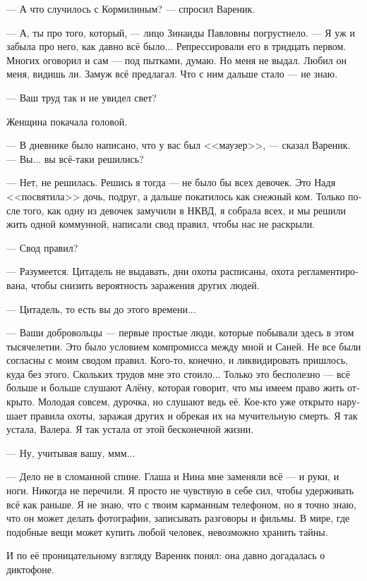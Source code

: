 \documentclass[a5paper,12pt,fleqn]{extbook}\usepackage{cooltooltips}\usepackage{polyglossia}\setdefaultlanguage[babelshorthands=true]{russian}\setotherlanguage{english}\defaultfontfeatures{Ligatures=TeX,Mapping=tex-text} \usepackage{xcolor}\definecolor{lightgray}{HTML}{bbbbbb}\color{lightgray}\newcommand{\ml}[3]{\textenglish{\textcolor{black}{#3}}}
\begin{document}
--- А что случилось с Кормилиным? --- спросил Вареник.

--- А, ты про того, который, --- лицо Зинаиды Павловны погрустнело.
--- Я уж и забыла про него, как давно всё было...
Репрессировали его в тридцать первом.
Многих оговорил и сам --- под пытками, думаю.
Но меня не выдал.
Любил он меня, видишь ли.
Замуж всё предлагал.
Что с ним дальше стало --- не знаю.

--- Ваш труд так и не увидел свет?

Женщина покачала головой.

--- В дневнике было написано, что у вас был <<маузер>>, --- сказал Вареник.
--- Вы... вы всё-таки решились?

--- Нет, не решилась.
Решись я тогда --- не было бы всех девочек.
Это Надя <<посвятила>> дочь, подруг, а дальше покатилось как снежный ком.
Только после того, как одну из девочек замучили в НКВД, я собрала всех, и мы решили жить одной коммунной, написали свод правил, чтобы нас не раскрыли.

--- Свод правил?

--- Разумеется.
Цитадель не выдавать, дни охоты расписаны, охота регламентирована, чтобы снизить вероятность заражения других людей.

--- Цитадель, то есть вы до этого времени...

--- Ваши добровольцы --- первые простые люди, которые побывали здесь в этом тысячелетии.
Это было условием компромисса между мной и Саней.
Не все были согласны с моим сводом правил.
Кого-то, конечно, и ликвидировать пришлось, куда без этого.
Скольких трудов мне это стоило...
Только это бесполезно --- всё больше и больше слушают Алёну, которая говорит, что мы имеем право жить открыто.
Молодая совсем, дурочка, но слушают ведь её.
Кое-кто уже открыто нарушает правила охоты, заражая других и обрекая их на мучительную смерть.
Я так устала, Валера.
Я так устала от этой бесконечной жизни.

--- Ну, учитывая вашу, ммм...

--- Дело не в сломанной спине.
Глаша и Нина мне заменяли всё --- и руки, и ноги.
Никогда не перечили.
Я просто не чувствую в себе сил, чтобы удерживать всё как раньше.
Я не знаю, что с твоим карманным телефоном, но я точно знаю, что он может делать фотографии, записывать разговоры и фильмы.
В мире, где подобные вещи может купить любой человек, невозможно хранить тайны.

И по её проницательному взгляду Вареник понял: она давно догадалась о диктофоне.
\end{document}
